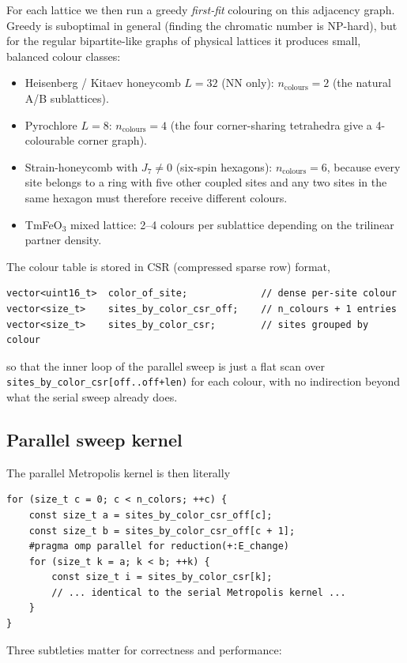 \documentclass[11pt,letterpaper]{article}
\begin{document}
For each lattice we then run a greedy \emph{first-fit} colouring on
this adjacency graph.  Greedy is suboptimal in general (finding the
chromatic number is NP-hard), but for the regular bipartite-like
graphs of physical lattices it produces small, balanced colour
classes:

\begin{itemize}[noitemsep]
  \item Heisenberg / Kitaev honeycomb $L=32$ (NN only):
        $n_{\text{colours}} = 2$ (the natural A/B sublattices).
  \item Pyrochlore $L=8$:
        $n_{\text{colours}} = 4$ (the four corner-sharing tetrahedra
        give a 4-colourable corner graph).
  \item Strain-honeycomb with $J_{7} \neq 0$ (six-spin hexagons):
        $n_{\text{colours}} = 6$, because every site belongs to a
        ring with five other coupled sites and any two sites in the
        same hexagon must therefore receive different colours.
  \item TmFeO$_3$ mixed lattice:
        2--4 colours per sublattice depending on the trilinear partner
        density.
\end{itemize}

The colour table is stored in CSR (compressed sparse row) format,
\begin{lstlisting}
vector<uint16_t>  color_of_site;             // dense per-site colour
vector<size_t>    sites_by_color_csr_off;    // n_colours + 1 entries
vector<size_t>    sites_by_color_csr;        // sites grouped by colour
\end{lstlisting}
so that the inner loop of the parallel sweep is just a flat scan over
\texttt{sites\_by\_color\_csr[off..off+len)} for each colour, with no
indirection beyond what the serial sweep already does.

\subsection{Parallel sweep kernel}

The parallel Metropolis kernel is then literally
\begin{lstlisting}
for (size_t c = 0; c < n_colors; ++c) {
    const size_t a = sites_by_color_csr_off[c];
    const size_t b = sites_by_color_csr_off[c + 1];
    #pragma omp parallel for reduction(+:E_change)
    for (size_t k = a; k < b; ++k) {
        const size_t i = sites_by_color_csr[k];
        // ... identical to the serial Metropolis kernel ...
    }
}
\end{lstlisting}
Three subtleties matter for correctness and performance:
\end{document}
